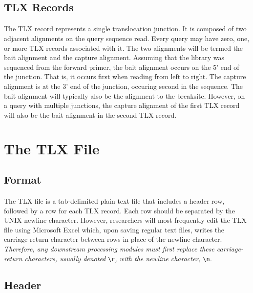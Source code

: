 \documentclass{article}
\begin{document}
\subsection*{TLX Records}
\paragraph{} The TLX record represents a single translocation junction. It is composed of two adjacent alignments on the query sequence read. Every query may have zero, one, or more TLX records associated with it. The two alignments will be termed the bait alignment and the capture alignment. Assuming that the library was sequenced from the forward primer, the bait alignment occurs on the 5' end of the junction. That is, it occurs first when reading from left to right. The capture alignment is at the 3' end of the junction, occuring second in the sequence. The bait alignment will typically also be the alignment to the breaksite. However, on a query with multiple junctions, the capture alignment of the first TLX record will also be the bait alignment in the second TLX record.

\section{The TLX File}

\subsection*{Format}
\paragraph{} The TLX file is a tab-delimited plain text file that includes a header row, followed by a row for each TLX record. Each row should be separated by the UNIX newline character. However, researchers will most frequently edit the TLX file using Microsoft Excel which, upon saving regular text files, writes the carriage-return character between rows in place of the newline character. \emph{Therefore, any downstream processing modules must first replace these carriage-return characters, usually denoted} \texttt{\textbackslash{}r}\emph{, with the newline character,} \texttt{\textbackslash{}n}\emph{.}

\subsection*{Header}
\end{document}
